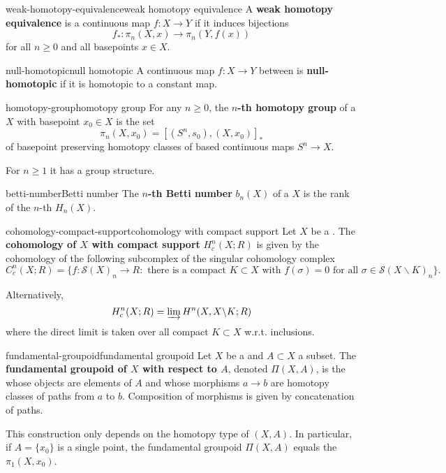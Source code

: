 \begin{topic}{weak-homotopy-equivalence}{weak homotopy equivalence}
    A \textbf{weak homotopy equivalence} is a continuous map $f : X \to Y$ if it induces bijections
    \[ f_* : \pi_n(X, x) \to \pi_n(Y, f(x)) \]
    for all $n \ge 0$ and all basepoints $x \in X$.
\end{topic}

\begin{topic}{null-homotopic}{null homotopic}
    A continuous map $f : X \to Y$ between  is \textbf{null-homotopic} if it is homotopic to a constant map.
\end{topic}

\begin{topic}{homotopy-group}{homotopy group}
    For any $n \ge 0$, the \textbf{$n$-th homotopy group} of a  $X$ with basepoint $x_0 \in X$ is the set
    \[ \pi_n(X, x_0) = [(S^n, s_0), (X, x_0)]_* \]
    of basepoint preserving homotopy classes of based continuous maps $S^n \to X$.
    
    For $n \ge 1$ it has a group structure.
\end{topic}

\begin{topic}{betti-number}{Betti number}
    The \textbf{$n$-th Betti number} $b_n(X)$ of a  $X$ is the rank of the $n$-th  $H_n(X)$.
\end{topic}

\begin{topic}{cohomology-compact-support}{cohomology with compact support}
    Let $X$ be a . The \textbf{cohomology of $X$ with compact support} $H_c^n(X; R)$ is given by the cohomology of the following subcomplex of the singular cohomology complex
    \[ C_c^n(X; R) = \big\{ f : \mathcal{S}(X)_n \to R : \text{ there is a compact $K \subset X$ with $f(\sigma) = 0$ for all $\sigma \in \mathcal{S}(X \backslash K)_n$} \big\} . \]
    
    Alternatively,
    \[ H_c^n(X; R) = \varinjlim H^n(X, X \backslash K; R) \]
    where the direct limit is taken over all compact $K \subset X$ w.r.t. inclusions.
\end{topic}

\begin{topic}{fundamental-groupoid}{fundamental groupoid}
    Let $X$ be a  and $A \subset X$ a subset. The \textbf{fundamental groupoid of $X$ with respect to $A$}, denoted $\Pi(X, A)$, is the  whose objects are elements of $A$ and whose morphisms $a \to b$ are homotopy classes of paths from $a$ to $b$. Composition of morphisms is given by concatenation of paths.
    
    This construction only depends on the homotopy type of $(X, A)$. In particular, if $A = \{ x_0 \}$ is a single point, the fundamental groupoid $\Pi(X, A)$ equals the  $\pi_1(X, x_0)$.
\end{topic}

